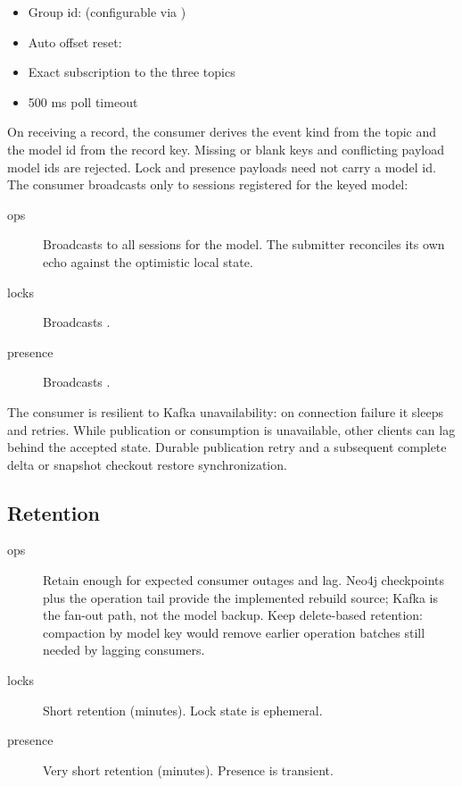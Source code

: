 \begin{itemize}
\item Group id:  (configurable via
  )
\item Auto offset reset: 
\item Exact subscription to the three  topics
\item 500 ms poll timeout
\end{itemize}

On receiving a record, the consumer derives the event kind from the topic
and the model id from the record key. Missing or blank keys and conflicting
payload model ids are rejected. Lock and presence payloads need not carry a
model id. The consumer broadcasts only to sessions registered for the keyed
model:

\begin{description}
\item[ops] Broadcasts  to all sessions for the model.
  The submitter reconciles its own echo against the optimistic local state.
\item[locks] Broadcasts .
\item[presence] Broadcasts .
\end{description}

The consumer is resilient to Kafka unavailability: on connection failure it
sleeps and retries. While publication or consumption is unavailable, other
clients can lag behind the accepted state. Durable publication retry and a
subsequent complete delta or snapshot checkout restore synchronization.

\subsection{Retention}

\begin{description}
\item[ops] Retain enough for expected consumer outages and lag. Neo4j
  checkpoints plus the operation tail provide the implemented rebuild source;
  Kafka is the fan-out path, not the model backup. Keep delete-based
  retention: compaction by model key would remove earlier operation batches
  still needed by lagging consumers.
\item[locks] Short retention (minutes). Lock state is ephemeral.
\item[presence] Very short retention (minutes). Presence is transient.
\end{description}

